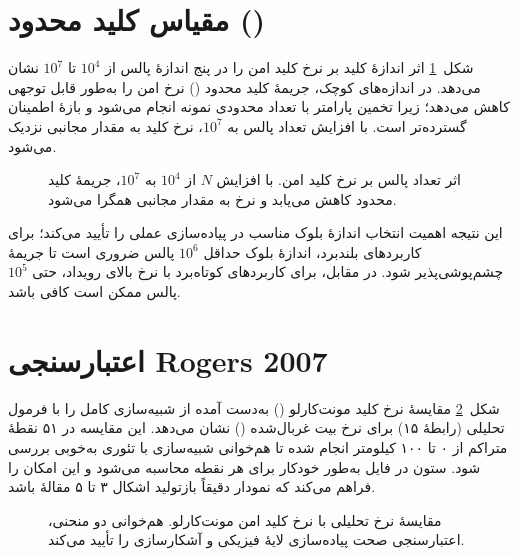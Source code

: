 \section{مقیاس کلید محدود ()}
شکل~\ref{fig:02_finite_key} اثر اندازهٔ کلید بر نرخ کلید امن را در پنج اندازهٔ پالس از $10^4$ تا $10^7$ نشان می‌دهد. در اندازه‌های کوچک، جریمهٔ کلید محدود () نرخ امن را به‌طور قابل توجهی کاهش می‌دهد؛ زیرا تخمین پارامتر با تعداد محدودی نمونه انجام می‌شود و بازهٔ اطمینان  گسترده‌تر است. با افزایش تعداد پالس به $10^7$، نرخ کلید به مقدار مجانبی نزدیک می‌شود.

\begin{figure}[htbp]
\centering
{}
\caption{اثر تعداد پالس بر نرخ کلید امن. با افزایش $N$ از $10^4$ به $10^7$، جریمهٔ کلید محدود کاهش می‌یابد و نرخ به مقدار مجانبی همگرا می‌شود.}
\label{fig:02_finite_key}
\end{figure}

این نتیجه اهمیت انتخاب اندازهٔ بلوک مناسب در پیاده‌سازی عملی  را تأیید می‌کند؛ برای کاربردهای بلندبرد، اندازهٔ بلوک حداقل $10^6$ پالس ضروری است تا جریمهٔ  چشم‌پوشی‌پذیر شود. در مقابل، برای کاربردهای کوتاه‌برد با نرخ بالای رویداد، حتی $10^5$ پالس ممکن است کافی باشد.

\section{اعتبارسنجی Rogers 2007}
شکل~\ref{fig:09_rogers} مقایسهٔ نرخ کلید مونت‌کارلو () به‌دست آمده از شبیه‌سازی کامل را با فرمول تحلیلی  (رابطهٔ ۱۵) برای نرخ بیت غربال‌شده () نشان می‌دهد. این مقایسه در ۵۱ نقطهٔ متراکم از ۰ تا ۱۰۰ کیلومتر انجام شده تا هم‌خوانی شبیه‌سازی با تئوری به‌خوبی بررسی شود. ستون  در فایل  به‌طور خودکار برای هر نقطه محاسبه می‌شود و این امکان را فراهم می‌کند که نمودار دقیقاً بازتولید اشکال ۳ تا ۵ مقالهٔ  باشد.

\begin{figure}[htbp]
\centering
{}
\caption{مقایسهٔ نرخ  تحلیلی  با نرخ کلید امن مونت‌کارلو. هم‌خوانی دو منحنی، اعتبارسنجی صحت پیاده‌سازی لایهٔ فیزیکی و آشکارسازی را تأیید می‌کند.}
\label{fig:09_rogers}
\end{figure}


